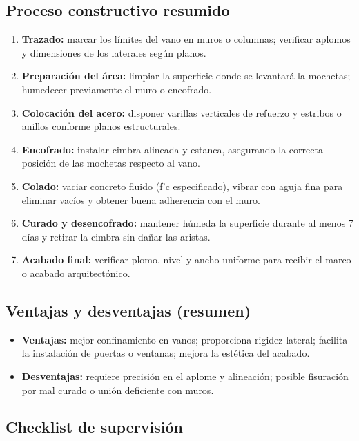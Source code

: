 \documentclass[12pt]{article}
\begin{document}
	\subsection*{Proceso constructivo resumido}
	\begin{enumerate}[leftmargin=*, itemsep=2pt]
		\item \textbf{Trazado:} marcar los límites del vano en muros o columnas; verificar aplomos y dimensiones de los laterales según planos.
		\item \textbf{Preparación del área:} limpiar la superficie donde se levantará la mochetas; humedecer previamente el muro o encofrado.
		\item \textbf{Colocación del acero:} disponer varillas verticales de refuerzo y estribos o anillos conforme planos estructurales.
		\item \textbf{Encofrado:} instalar cimbra alineada y estanca, asegurando la correcta posición de las mochetas respecto al vano.
		\item \textbf{Colado:} vaciar concreto fluido (f’c especificado), vibrar con aguja fina para eliminar vacíos y obtener buena adherencia con el muro.
		\item \textbf{Curado y desencofrado:} mantener húmeda la superficie durante al menos 7 días y retirar la cimbra sin dañar las aristas.
		\item \textbf{Acabado final:} verificar plomo, nivel y ancho uniforme para recibir el marco o acabado arquitectónico.
	\end{enumerate}
	
	\subsection*{Ventajas y desventajas (resumen)}
	\begin{itemize}[leftmargin=*, itemsep=2pt]
		\item \textbf{Ventajas:} mejor confinamiento en vanos; proporciona rigidez lateral; facilita la instalación de puertas o ventanas; mejora la estética del acabado.
		\item \textbf{Desventajas:} requiere precisión en el aplome y alineación; posible fisuración por mal curado o unión deficiente con muros.
	\end{itemize}
	
	\subsection{Checklist de supervisión}
	
\end{document}
